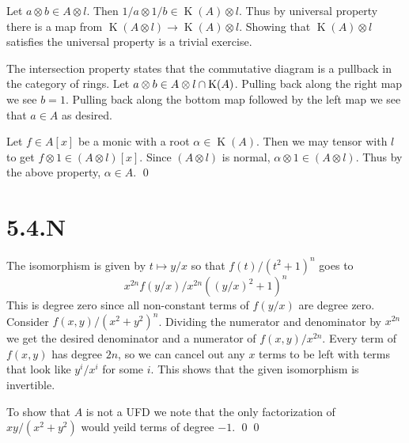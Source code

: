 \documentclass{article}
\begin{document}
Let $a \otimes b \in A \otimes l$. Then $1/a \otimes 1/b \in \operatorname{K}(A) \otimes l$. Thus by universal
property there is a map from $\operatorname{K}(A \otimes l) \to \operatorname{K}(A) \otimes l$. Showing that
$\operatorname{K}(A) \otimes l$ satisfies the universal property is a trivial exercise.

The intersection property states that the commutative diagram is a pullback in
the category of rings. Let $a \otimes b \in A \otimes l \cap \operatorname{K}(A)$. Pulling back along the
right map we see $b=1$. Pulling back along the bottom map
followed by the left map we see that $a \in A$ as desired.

Let $f \in A[x]$ be a monic with a root $\alpha \in \operatorname{K}(A)$.
Then we may tensor with $l$ to get $f \otimes 1 \in (A \otimes l)[x]$.
Since $(A \otimes l)$ is normal, $\alpha \otimes 1 \in (A \otimes l)$. Thus by the
above property, $\alpha \in A$. \qed

\section{5.4.N}
The isomorphism is given by $t \mapsto y/x$ so that
$f(t)/(t^2+1)^n$ goes to \[x^{2n}f(y/x)/x^{2n}((y/x)^2+1)^n\] This is degree zero
since all non-constant terms of $f(y/x)$ are degree zero.
Consider $f(x,y)/(x^2+y^2)^n$. Dividing the numerator and denominator by
$x^{2n}$ we get the desired denominator and a numerator of
$f(x, y)/x^{2n}$. Every term of $f(x,y)$ has degree
$2n$, so we can cancel out any $x$ terms
to be left with terms that look like $y^i/x^i$ for some
$i$. This shows that the given isomorphism is invertible.

To show that $A$ is not a UFD we note that the only
factorization of $xy/(x^2+y^2)$ would yeild terms of degree
$-1$. \qed \qed
\end{document}
